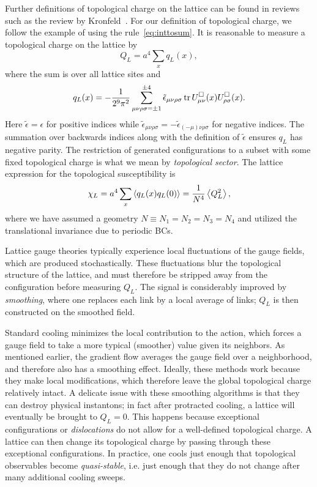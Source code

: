 Further definitions of topological charge on the lattice can be found 
in reviews such as the review by Kronfeld~\cite{kronfeld_topological_1988}.
For our definition of topological charge, we follow the example of 
 using the rule~\eqref{eq:inttosum}. It is reasonable to 
measure a topological charge on the lattice by
\begin{equation}\label{eq:QL}
  Q_L=a^4\sum_x q_L(x),
\end{equation}
where the sum is over all lattice sites and
\begin{equation}\label{eq:QLdensity}
  q_L(x) = -\frac{1}{2^9\pi^2}\sum\limits_{\mu\nu\rho\sigma=\pm 1}^{\pm 4}
         \tilde{\epsilon}_{\mu\nu\rho\sigma}
         \tr U^\Box_{\mu\nu}(x)U^\Box_{\rho\sigma}(x).
\end{equation}
Here $\tilde{\epsilon}=\epsilon$ for positive indices while
$\tilde{\epsilon}_{\mu\nu\rho\sigma}=
  -\tilde{\epsilon}_{(-\mu)\nu\rho\sigma}$ for negative indices.
The summation over backwards indices along with the definition of
$\tilde{\epsilon}$ ensures $q_L$ has negative parity.
The restriction of generated configurations to a subset with some fixed
topological charge is what we mean by 
{\it topological sector}.
The lattice expression for the topological susceptibility is
\begin{equation}
  \chi_L=a^4\sum_x\ev{q_L(x)q_L(0)}=\frac{1}{N^4}\ev{Q_L^2},
\end{equation}
where we have assumed a geometry $N\equiv N_1=N_2=N_3=N_4$
and utilized the translational invariance due to periodic BCs.

Lattice gauge theories typically experience
local fluctuations of the gauge fields, which are produced stochastically. 
These fluctuations blur the topological structure of the lattice, and 
must therefore be stripped away from the configuration before measuring 
$Q_L$. The signal is considerably improved by 
{\it smoothing}, where one replaces each link by a local average of links; 
$Q_L$ is then constructed on the smoothed field. 

Standard cooling minimizes the local contribution
to the action, which forces a gauge field to take a more typical
(smoother) value given its neighbors.
As mentioned earlier, the gradient flow averages the gauge field over 
a neighborhood, and therefore also has a smoothing effect. 
Ideally, these methods work because they make local modifications,
which therefore leave the global topological charge relatively intact.
A delicate issue with these smoothing algorithms is that they can destroy 
physical instantons; in fact after protracted cooling, a lattice will
eventually be brought to $Q_L=0$. This happens because
exceptional configurations or 
{\it dislocations} do not allow
for a well-defined topological charge. A lattice can then change
its topological charge by passing through these exceptional configurations.
In practice, one cools just enough
that topological observables become {\it quasi-stable}, i.e. just
enough that they do not change after many additional cooling sweeps.

